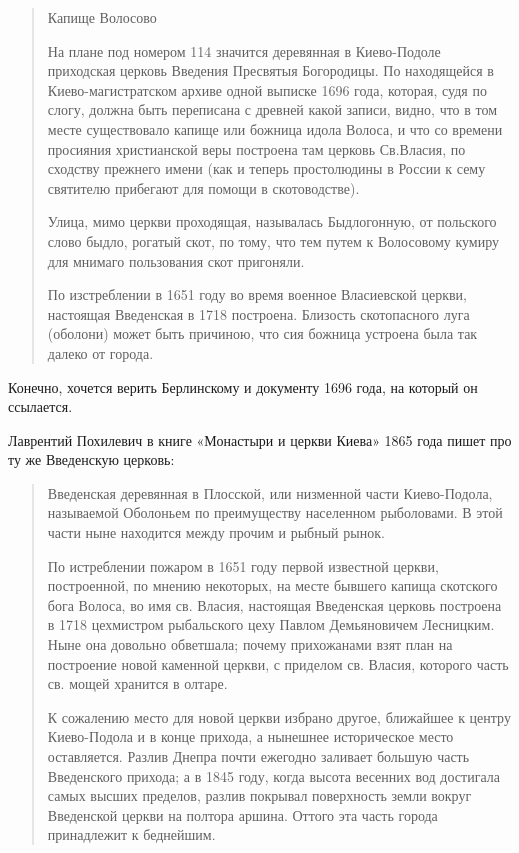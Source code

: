 \begin{quotation}
Капище Волосово\newline

На плане под номером 114 значится деревянная в Киево-Подоле приходская церковь Введения Пресвятыя Богородицы.
По находящейся в Киево-магистратском архиве одной выписке 1696 года, которая, судя по слогу, должна быть переписана с древней какой записи, видно, что в том месте существовало капище или божница идола Волоса, и что со времени просияния христианской веры построена там церковь Св.Власия, по сходству прежнего имени (как и теперь простолюдины в России к сему святителю прибегают для помощи в скотоводстве).

Улица, мимо церкви проходящая, называлась Быдлогонную, от польского слово быдло, рогатый скот, по тому, что тем путем к Волосовому кумиру для мнимаго пользования скот пригоняли.

По изстреблении в 1651 году во время военное Власиевской церкви, настоящая Введенская в 1718 построена. Близость скотопасного луга (оболони) может быть причиною, что сия божница устроена была так далеко от города.
\end{quotation}

Конечно, хочется верить Берлинскому и документу 1696 года, на который он ссылается.  

Лаврентий Похилевич в книге «Монастыри и церкви Киева» 1865 года пишет про ту же Введенскую церковь:

\begin{quotation}
Введенская деревянная в Плосской, или низменной части Киево-Подола, называемой Оболоньем по преимуществу населенном рыболовами. В этой части ныне находится между прочим и рыбный рынок.

По истреблении пожаром в 1651 году первой известной церкви, построенной, по мнению некоторых, на месте бывшего капища скотского бога Волоса, во имя св. Власия, настоящая Введенская церковь построена в 1718 цехмистром рыбальского цеху Павлом Демьяновичем Лесницким. Ныне она довольно обветшала; почему прихожанами взят план на построение новой каменной церкви, с приделом св. Власия, которого часть св. мощей хранится в олтаре.

К сожалению место для новой церкви избрано другое, ближайшее к центру Киево-Подола и в конце прихода, а нынешнее историческое место оставляется. Разлив Днепра почти ежегодно заливает большую часть Введенского прихода; а в 1845 году, когда высота весенних вод достигала самых высших пределов, разлив покрывал поверхность земли вокруг Введенской церкви на полтора аршина. Оттого эта часть города принадлежит к беднейшим.
\end{quotation}

